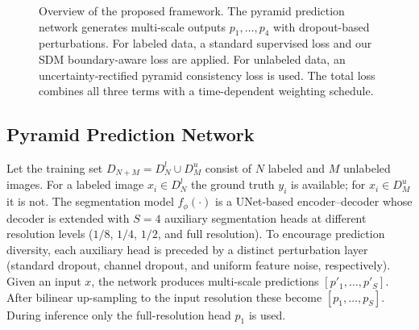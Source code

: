 \begin{figure}[t]
    \centering
    \caption{Overview of the proposed framework. The pyramid prediction network generates multi-scale outputs $p_1,\ldots,p_4$ with dropout-based perturbations. For labeled data, a standard supervised loss and our SDM boundary-aware loss are applied. For unlabeled data, an uncertainty-rectified pyramid consistency loss is used. The total loss combines all three terms with a time-dependent weighting schedule.}
    \label{fig:framework}
\end{figure}


\subsection{Pyramid Prediction Network}
\label{sec:pyramid}

Let the training set $D_{N+M} = D^l_N \cup D^u_M$ consist of $N$ labeled and $M$ unlabeled images. For a labeled image $x_i \in D^l_N$ the ground truth $y_i$ is available; for $x_i \in D^u_M$ it is not. The segmentation model $f_\phi(\cdot)$ is a UNet-based encoder--decoder whose decoder is extended with $S{=}4$ auxiliary segmentation heads at different resolution levels ($1/8$, $1/4$, $1/2$, and full resolution). To encourage prediction diversity, each auxiliary head is preceded by a distinct perturbation layer (standard dropout, channel dropout, and uniform feature noise, respectively). Given an input $x$, the network produces multi-scale predictions $[p'_1, \ldots, p'_S]$. After bilinear up-sampling to the input resolution these become $[p_1, \ldots, p_S]$. During inference only the full-resolution head $p_1$ is used.

